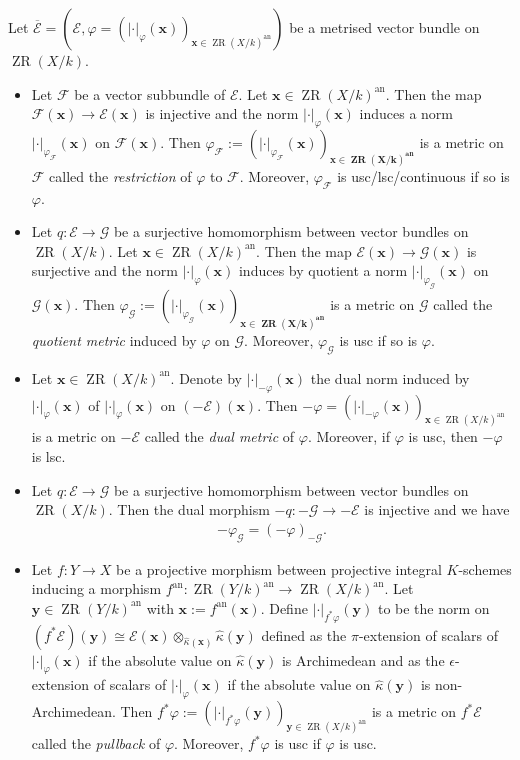 \documentclass [11pt,reqno]{amsart}
\newcommand{\1}{\mathmybb{1}}
\def\cE{{\mathcal{E}}}
\def\cF{{\mathcal{F}}}
\def\cG{{\mathcal{G}}}
\def\an{\operatorname{an}}
\def\ZR{\operatorname{ZR}}
\begin{document}
\begin{proposition-definition}
\label{prop-def:_metrised_vector_bundles_constructions}
Let $\overline{\cE}=(\cE,\varphi=(|\cdot|_{\varphi}(\mathbf{x}))_{\mathbf{x}\in\ZR(X/k)^{\an}})$ be a metrised vector bundle on $\ZR(X/k)$.
\begin{itemize}
	\item[(1)] Let $\cF$ be a vector subbundle of $\cE$. Let $\mathbf{x}\in\ZR(X/k)^{\an}$. Then the map $\cF(\mathbf{x})\to\cE(\mathbf{x})$ is injective and the norm $|\cdot|_{\varphi}(\mathbf{x})$ induces a norm $|\cdot|_{\varphi_{\cF}}(\mathbf{x})$ on $\cF(\mathbf{x})$. Then $\varphi_{\cF}:=(|\cdot|_{\varphi_{\cF}}(\mathbf{x}))_{\mathbf{x\in\ZR(X/k)^{\an}}}$ is a metric on $\cF$ called the \emph{restriction} of $\varphi$ to $\cF$. Moreover, $\varphi_{\cF}$ is usc/lsc/continuous if so is $\varphi$.
	\item[(2)] Let $q:\cE\to\cG$ be a surjective homomorphism between vector bundles on $\ZR(X/k)$. Let $\mathbf{x}\in\ZR(X/k)^{\an}$. Then the map $\cE(\mathbf{x})\to\cG(\mathbf{x})$ is surjective and the norm $|\cdot|_{\varphi}(\mathbf{x})$ induces by quotient a norm $|\cdot|_{\varphi_{\cG}}(\mathbf{x})$ on $\cG(\mathbf{x})$. Then $\varphi_{\cG}:=(|\cdot|_{\varphi_{\cG}}(\mathbf{x}))_{\mathbf{x\in\ZR(X/k)^{\an}}}$ is a metric on $\cG$ called the \emph{quotient metric} induced by $\varphi$ on $\cG$. Moreover, $\varphi_{\cG}$ is usc if so is $\varphi$.
	\item[(3)] Let $\mathbf{x}\in\ZR(X/k)^{\an}$. Denote by $|\cdot|_{-\varphi}(\mathbf{x})$ the dual norm induced by $|\cdot|_{\varphi}(\mathbf{x})$ of $|\cdot|_{\varphi}(\mathbf{x})$ on $(-\cE)(\mathbf{x})$. Then $-\varphi=(|\cdot|_{-\varphi}(\mathbf{x}))_{\mathbf{x}\in\ZR(X/k)^{\an}}$ is a metric on $-\cE$ called the \emph{dual metric} of $\varphi$. Moreover, if $\varphi$ is usc, then $-\varphi$ is lsc. 
	\item[(4)] Let $q:\cE\to\cG$ be a surjective homomorphism between vector bundles on $\ZR(X/k)$. Then the dual morphism $-q : -\cG \to -\cE$ is injective and we have
	\begin{align*}
	-\varphi_{\cG} = (-\varphi)_{-\cG}.
	\end{align*}
	\item[(5)] Let $f:Y\to X$ be a projective morphism between projective integral $K$-schemes inducing a morphism $f^{\an}:\ZR(Y/k)^{\an}\to\ZR(X/k)^{\an}$. Let $\mathbf{y}\in\ZR(Y/k)^{\an}$ with $\mathbf{x}:=f^{\an}(\mathbf{x})$. Define $|\cdot|_{f^{\ast}\varphi}(\mathbf{y})$ to be the norm on $(f^{\ast}\cE)(\mathbf{y})\cong\cE(\mathbf{x})\otimes_{\widehat{\kappa}(\mathbf{x})}\widehat{\kappa}(\mathbf{y})$ defined as the $\pi$-extension of scalars of $|\cdot|_{\varphi}(\mathbf{x})$ if the absolute value on $\widehat{\kappa}(\mathbf{y})$ is Archimedean and as the $\epsilon$-extension of scalars of $|\cdot|_{\varphi}(\mathbf{x})$ if the absolute value on $\widehat{\kappa}(\mathbf{y})$ is non-Archimedean. Then $f^{\ast}\varphi:=(|\cdot|_{f^{\ast}\varphi}(\mathbf{y}))_{\mathbf{y}\in\ZR(X/k)^{\an}}$ is a metric on $f^{\ast}\cE$ called the \emph{pullback} of $\varphi$. Moreover, $f^{\ast}\varphi$ is usc if $\varphi$ is usc.
\end{itemize}
\end{proposition-definition}
\end{document}
